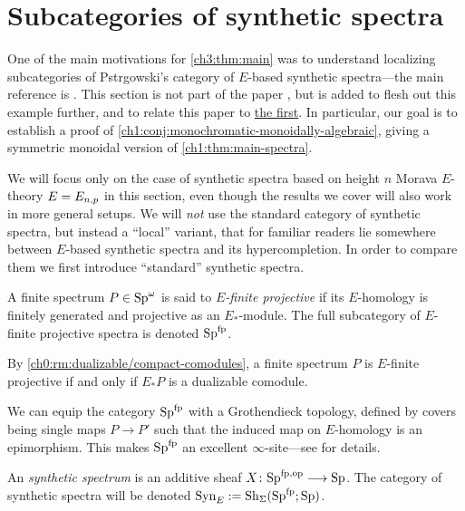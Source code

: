 
\section{Subcategories of synthetic spectra}
\label{ch3:addendum}

One of the main motivations for \cref{ch3:thm:main} was to understand localizing subcategories of Pstr\a{}gowski's category of $E$-based synthetic spectra---the main reference is \cite{pstragowski_2022}. This section is not part of the paper \cite{aambo_2024_localizing}, but is added to flesh out this example further, and to relate this paper to \hyperref[ch1]{the first}. In particular, our goal is to establish a proof of \cref{ch1:conj:monochromatic-monoidally-algebraic}, giving a symmetric monoidal version of \cref{ch1:thm:main-spectra}. 

We will focus only on the case of synthetic spectra based on height $n$ Morava $E$-theory $E=E_{n,p}$ in this section, even though the results we cover will also work in more general setups. We will \emph{not} use the standard category of synthetic spectra, but instead a ``local'' variant, that for familiar readers lie somewhere between $E$-based synthetic spectra and its hypercompletion. In order to compare them we first introduce ``standard'' synthetic spectra. 

\begin{definition}
    A finite spectrum $P\in \mathrm{Sp}^\omega$ is said to \emph{$E$-finite projective} if its $E$-homology is finitely generated and projective as an $E_{*}$-module. The full subcategory of $E$-finite projective spectra is denoted $\mathrm{Sp}^{\mathrm{fp}}$. 
\end{definition}

\begin{remark}
    By \cref{ch0:rm:dualizable/compact-comodules}, a finite spectrum $P$ is $E$-finite projective if and only if $E_{*}P$ is a dualizable comodule. 
\end{remark}

We can equip the category $\mathrm{Sp}^{\mathrm{fp}}$ with a Grothendieck topology, defined by covers being single maps $P\to P'$ such that the induced map on $E$-homology is an epimorphism. This makes $\mathrm{Sp}^{\mathrm{fp}}$ an excellent $\infty$-site---see \cite[Section 2.3]{pstragowski_2022} for details. 

\begin{definition}
    An \emph{synthetic spectrum} is an additive sheaf $X\colon \mathrm{Sp}^{\mathrm{fp}, \mathrm{op}}\longrightarrow \mathrm{Sp}$. The category of synthetic spectra will be denoted $\mathrm{Syn}_{E} := \mathrm{Sh}_\Sigma(\mathrm{Sp}^{\mathrm{fp}};\mathrm{Sp})$. 
\end{definition}

